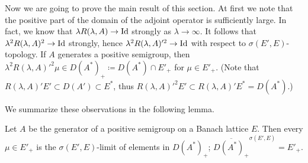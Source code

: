 Now we are going to prove the main result of this section. 
At first we note that the positive part of the domain of the adjoint operator is sufficiently large. 
In fact, we know that $\lambda R(\lambda,A) \to \operatorname{Id} $ strongly as $\lambda \to \infty$. 
It follows that $\lambda^2R(\lambda,A)^2 \to \operatorname{Id} $ strongly, hence $\lambda^2R(\lambda,A)'^2 \to \operatorname{Id} $ with respect to $\sigma(E',E)$-topology. 
If $A$ generates a positive semigroup, then $\lambda^2R(\lambda,A)'^2\mu \in D(A^*)_{+} \coloneq D(A^*)\cap E'_{+}$ for $\mu \in E'_+$. 
(Note that $R(\lambda,A)'E' \subset D(A') \subset E^*$, thus $R(\lambda,A)'^2E' \subset R(\lambda,A)'E^* = D(A^*)$.)

We summarize these observations in the following lemma.

\begin{lemma}\label{lem:b4-1.3}%
Let $A$ be the generator of a positive semigroup on a Banach lattice $E$. Then every $\mu \in E'_+$ is the $\sigma(E',E)$-limit of elements in $D(A^*)_{+}$; \ie $\overline{D(A^*)_+}^{\sigma(E',E)} = E'_+$.
\end{lemma}

